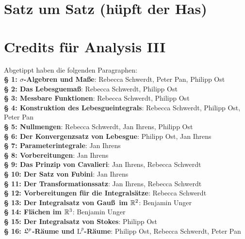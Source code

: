 \documentclass[a4paper,twoside,DIV15,BCOR12mm,chapterprefix=true,headings=onelinechapter]{scrbook}
\begin{document}
\appendix
\chapter{Satz um Satz (hüpft der Has)}

\renewcommand{\indexname}{Stichwortverzeichnis}
\printindex

\chapter{Credits für Analysis III} Abgetippt haben die folgenden Paragraphen:\\%
\textbf{§ 1: $\sigma$-Algebren und Maße}: Rebecca Schwerdt, Peter Pan, Philipp Ost\\
\textbf{§ 2: Das Lebesguemaß}: Rebecca Schwerdt, Philipp Ost\\
\textbf{§ 3: Messbare Funktionen}: Rebecca Schwerdt, Philipp Ost\\
\textbf{§ 4: Konstruktion des Lebesgueintegrals}: Rebecca Schwerdt, Philipp Ost, Peter Pan\\
\textbf{§ 5: Nullmengen}: Rebecca Schwerdt, Jan Ihrens, Philipp Ost\\
\textbf{§ 6: Der Konvergenzsatz von Lebesgue}: Philipp Ost, Jan Ihrens \\
\textbf{§ 7: Parameterintegrale}: Jan Ihrens \\
\textbf{§ 8: Vorbereitungen}: Jan Ihrens \\
\textbf{§ 9: Das Prinzip von Cavalieri}: Jan Ihrens, Rebecca Schwerdt\\
\textbf{§ 10: Der Satz von Fubini}: Jan Ihrens\\
\textbf{§ 11: Der Transformationssatz}: Jan Ihrens, Rebecca Schwerdt\\
\textbf{§ 12: Vorbereitungen für die Integralsätze}: Rebecca Schwerdt\\
\textbf{§ 13: Der Integralsatz von Gau\ss \ im \(\mathbb{R}^{2}\)}: Benjamin Unger\\ 
\textbf{§ 14: Flächen im \(\mathbb{R}^{3}\)}: Benjamin Unger\\
\textbf{§ 15: Der Integralsatz von Stokes}: Philipp Ost\\
\textbf{§ 16: \(\mathfrak{L}^{p}\)-Räume und \(\mathrm{L}^{p}\)-Räume}: Philipp Ost, Rebecca Schwerdt, Peter Pan \\
\end{document}
